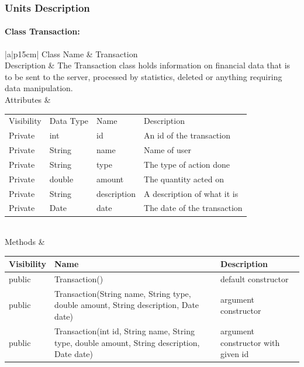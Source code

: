 \documentclass[12pt]{article}
\begin{document}
\subsubsection{Units Description}






\paragraph{Class Transaction:} 
\begin{table}[H]
	\begin{tabular}{|a|p{15cm}|}
		\hline
		{Class Name} & {Transaction} \\
		\hline
		Description & The Transaction class holds information on financial data that is to be sent to the server, processed by statistics, deleted or anything requiring data manipulation. \\
		\hline
		Attributes & 
		\begin{tabular}{| p{2cm} | p{2cm} | p{3cm} | p{6.45cm} |}
			\hline
			\rowcolor{lightgray}
			Visibility & Data Type & Name & Description \\
			\rowcolor{white}
			Private & int & id & An id of the transaction \\
			\hline
			Private & String & name & Name of user\\
			\hline
			Private & String & type & The type of action done \\
			\hline
			Private & double & amount & The quantity acted on \\
			\hline
			Private & String & description & A description of what it is \\
			\hline
			Private & Date & date & The date of the transaction \\
			\hline
		\end{tabular} \\
		\hline
		Methods & 		 
		\begin{tabular}{| p{2cm} | p{5cm} | p{6.9cm} |}
			\hline
			\rowcolor{gray}
			{Visibility} &{Name} & {Description} \\
			\hline
			\rowcolor{white}
			public &  Transaction() & default constructor\\
			\hline
			public &  Transaction(String name, String type, double amount, String description, Date date) & argument constructor\\
			\hline
			public & Transaction(int id, String name, String type, double amount, String description, Date date) & argument constructor with given id\\

\end{tabular}
\end{tabular}
\end{table}
\end{document}
